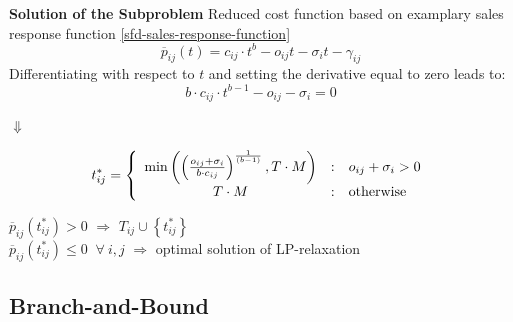 \documentclass[xcolor=dvipsnames,aspectratio=169, handout, mathserif]{beamer}
\begin{document}
\begin{frame}{\textbf{Solution of the Subproblem}}
Reduced cost function based on examplary sales response function \eqref{sfd-sales-response-function}
\[
  \overline{p}_{ij}(t) =   c_{ij} \cdot t^b - o_{ij} t  - \sigma_i t - \gamma_{ij}  
\]
\vspace{-1mm}
\noindent Differentiating with respect to $t$ and setting the derivative equal to zero leads to: 
\vspace{-1mm}
\begin{equation}
              b \cdot c_{ij} \cdot t^{b-1} - o_{ij} - \sigma_i = 0 
\end{equation}

\centerline{$\Downarrow$}
\vspace{-4mm}
\begin{equation} 
  t_{ij}^* = \left\{ \begin{array}{c@{\quad:\quad}l}
          \min \left(  \left({\frac{ o_{ij} + \sigma_i } { b \cdot
          c_{ij}}}\right)^{ \frac{1}{(b-1)}},T \cdot M \right)
                     & 
                   o_{ij} +  \sigma_i > 0\\
              T \cdot M &  \mbox{otherwise}
 \end{array} \right.
\end{equation} 

\vspace{-1mm}

 $ \overline{p}_{ij} (t_{ij}^*) > 0$ $\Rightarrow$ $T_{ij} \cup \left\{t_{ij}^*\right\}$\\[1.5ex]
 $ \overline{p}_{ij} (t_{ij}^*) \le 0 \; \;\forall \ i,j$ $\Rightarrow$ optimal solution of LP-relaxation

\end{frame}



\subsection{Branch-and-Bound}
\end{document}

